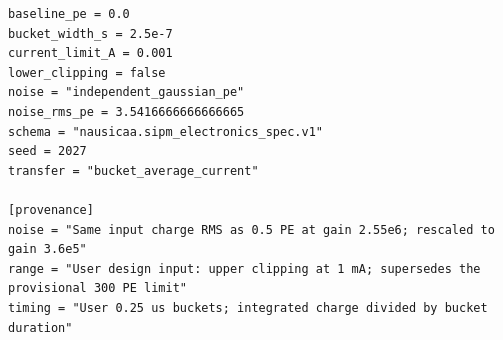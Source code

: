 \documentclass[11pt,a4paper]{article}
\begin{document}
\begin{Verbatim}[breaklines,breakanywhere,fontsize=\footnotesize]
baseline_pe = 0.0
bucket_width_s = 2.5e-7
current_limit_A = 0.001
lower_clipping = false
noise = "independent_gaussian_pe"
noise_rms_pe = 3.5416666666666665
schema = "nausicaa.sipm_electronics_spec.v1"
seed = 2027
transfer = "bucket_average_current"

[provenance]
noise = "Same input charge RMS as 0.5 PE at gain 2.55e6; rescaled to gain 3.6e5"
range = "User design input: upper clipping at 1 mA; supersedes the provisional 300 PE limit"
timing = "User 0.25 us buckets; integrated charge divided by bucket duration"

\end{Verbatim}
\end{document}
